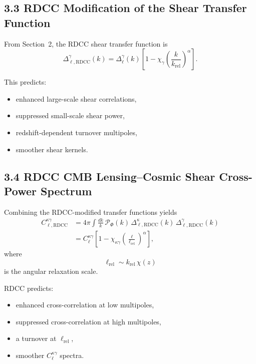 \documentclass[11pt,a4paper]{article}
\begin{document}
\subsection*{3.3 RDCC Modification of the Shear Transfer Function}

From Section~2, the RDCC shear transfer function is
\begin{equation}
    \Delta_{\ell,\mathrm{RDCC}}^{\gamma}(k)
    = \Delta_{\ell}^{\gamma}(k)
      \left[
        1 - \chi_{\gamma}
        \left(\frac{k}{k_{\mathrm{rel}}}\right)^{\alpha}
      \right].
\end{equation}

This predicts:

\begin{itemize}
    \item enhanced large-scale shear correlations,
    \item suppressed small-scale shear power,
    \item redshift-dependent turnover multipoles,
    \item smoother shear kernels.
\end{itemize}

\subsection*{3.4 RDCC CMB Lensing--Cosmic Shear Cross-Power Spectrum}

Combining the RDCC-modified transfer functions yields
\begin{align}
    C_{\ell,\mathrm{RDCC}}^{\kappa\gamma}
    &= 4\pi \int \frac{dk}{k}\,
       \mathcal{P}_{\Phi}(k)\,
       \Delta_{\ell,\mathrm{RDCC}}^{\kappa}(k)\,
       \Delta_{\ell,\mathrm{RDCC}}^{\gamma}(k) \\
    &= C_{\ell}^{\kappa\gamma}
       \left[
         1 - \chi_{\kappa\gamma}
         \left(\frac{\ell}{\ell_{\mathrm{rel}}}\right)^{\alpha}
       \right],
\end{align}
where
\begin{equation}
    \ell_{\mathrm{rel}}
    \sim k_{\mathrm{rel}}\,\chi(z)
\end{equation}
is the angular relaxation scale.

RDCC predicts:

\begin{itemize}
    \item enhanced cross-correlation at low multipoles,
    \item suppressed cross-correlation at high multipoles,
    \item a turnover at $\ell_{\mathrm{rel}}$,
    \item smoother $C_{\ell}^{\kappa\gamma}$ spectra.
\end{itemize}
\end{document}
